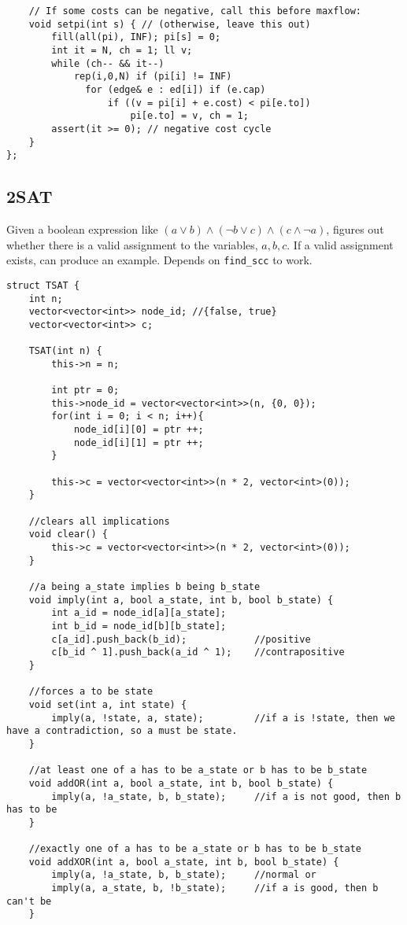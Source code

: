 \documentclass[8pt, headheight=10pt, a4paper]{article}
\begin{document}
\begin{multicols*}{3}
\begin{lstlisting}
	// If some costs can be negative, call this before maxflow:
	void setpi(int s) { // (otherwise, leave this out)
		fill(all(pi), INF); pi[s] = 0;
		int it = N, ch = 1; ll v;
		while (ch-- && it--)
			rep(i,0,N) if (pi[i] != INF)
			  for (edge& e : ed[i]) if (e.cap)
				  if ((v = pi[i] + e.cost) < pi[e.to])
					  pi[e.to] = v, ch = 1;
		assert(it >= 0); // negative cost cycle
	}
};
\end{lstlisting}

\subsection{2SAT}
Given a boolean expression like $(a \lor b) \land (\lnot b \lor c) \land (c \land \lnot a)$, figures out whether there is a valid assignment to the variables, $a, b, c$. If a valid assignment exists, can produce an example. 
Depends on \lstinline{find_scc} to work. 
\begin{lstlisting}
struct TSAT {
    int n;
    vector<vector<int>> node_id; //{false, true}
    vector<vector<int>> c;

    TSAT(int n) {
        this->n = n;

        int ptr = 0;
        this->node_id = vector<vector<int>>(n, {0, 0});
        for(int i = 0; i < n; i++){
            node_id[i][0] = ptr ++;
            node_id[i][1] = ptr ++;
        }

        this->c = vector<vector<int>>(n * 2, vector<int>(0));
    }

    //clears all implications
    void clear() {
        this->c = vector<vector<int>>(n * 2, vector<int>(0));
    }

    //a being a_state implies b being b_state
    void imply(int a, bool a_state, int b, bool b_state) {
        int a_id = node_id[a][a_state];
        int b_id = node_id[b][b_state];
        c[a_id].push_back(b_id);            //positive
        c[b_id ^ 1].push_back(a_id ^ 1);    //contrapositive
    }

    //forces a to be state
    void set(int a, int state) {
        imply(a, !state, a, state);         //if a is !state, then we have a contradiction, so a must be state. 
    }

    //at least one of a has to be a_state or b has to be b_state
    void addOR(int a, bool a_state, int b, bool b_state) {
        imply(a, !a_state, b, b_state);     //if a is not good, then b has to be
    }

    //exactly one of a has to be a_state or b has to be b_state
    void addXOR(int a, bool a_state, int b, bool b_state) {
        imply(a, !a_state, b, b_state);     //normal or
        imply(a, a_state, b, !b_state);     //if a is good, then b can't be
    }


\end{lstlisting}
\end{multicols*}
\end{document}
